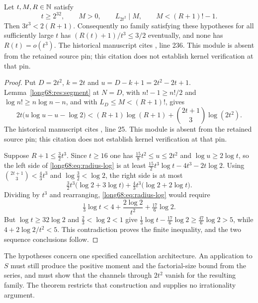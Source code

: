 \documentclass[11pt]{article}
\newcommand{\Ser}{S}
\newcommand{\Lc}{L}
\begin{document}
\label{long68:res:lead-channel-radius}
\begin{theorem}\label{long68:res:channel-radius}
Let $t,M,R\in\mathbb{N}$ satisfy
\[
 t\ge2^{32},\qquad M>0,\qquad \Lc_{2t^2}\mid M,\qquad M<(R+1)!-1 .
\]
Then $3t^3<2(R+1)$.  Consequently no family satisfying these hypotheses for
all sufficiently large $t$ has $(R(t)+1)/t^3\le3/2$ eventually, and none has
$R(t)=o(t^3)$.
  The historical manuscript cites , line 236. This module is absent from the retained source pin; this citation does not establish kernel verification at that pin.
\end{theorem}

\begin{proof}
Put $D=2t^2$, $k=2t$ and $u=D-k+1=2t^2-2t+1$.  Lemma~\ref{long68:res:segment} at
$N=D$, with $n!-1\ge n!/2$ and $\log n!\ge n\log n-n$, and with
$\Lc_D\le M<(R+1)!$, gives
\begin{equation}\label{long68:eq:radius-log}
 2t\bigl(u\log u-u-\log2\bigr)
 <(R+1)\log(R+1)+\binom{2t+1}{3}\log(2t^2).
\end{equation}
  The historical manuscript cites , line 25. This module is absent from the retained source pin; this citation does not establish kernel verification at that pin.

Suppose $R+1\le\tfrac32t^3$.  Since $t\ge16$ one has
$\tfrac{15}{8}t^2\le u\le2t^2$ and $\log u\ge2\log t$, so the left side of
\eqref{long68:eq:radius-log} is at least
$\tfrac{15}{2}t^3\log t-4t^3-2t\log2$.  Using
$\binom{2t+1}{3}<\tfrac43t^3$ and $\log\tfrac32<\log2$, the right side is at
most
\[
 \tfrac32t^3\bigl(\log2+3\log t\bigr)+\tfrac43t^3\bigl(\log2+2\log t\bigr).
\]
Dividing by $t^3$ and rearranging, \eqref{long68:eq:radius-log} would require
\[
 \tfrac13\log t<4+\frac{2\log2}{t^2}+\tfrac{17}6\log2 .
\]
But $\log t\ge32\log2$ and $\tfrac23<\log2<1$ give
$\tfrac13\log t-\tfrac{17}6\log2\ge\tfrac{47}6\log2>5$, while
$4+2\log2/t^2<5$.  This contradiction proves the finite inequality, and the
two sequence conclusions follow.
\end{proof}

The hypotheses concern one specified cancellation architecture.  An
application to $\Ser$ must still produce the positive moment and the
factorial-size bound from the series, and must show that the channels through
$2t^2$ vanish for the resulting family.  The theorem restricts that
construction and supplies no irrationality argument.
\end{document}
